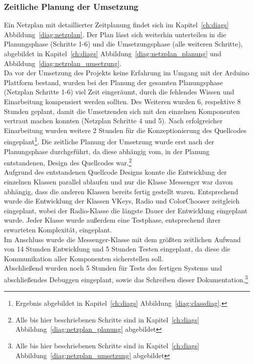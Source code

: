 \documentclass[a4paper, 11pt]{scrartcl}
\begin{document}
\subsubsection{Zeitliche Planung der Umsetzung}
Ein Netzplan mit detaillierter Zeitplanung findet sich im Kapitel~\ref{ch:diags} Abbildung~\ref{diag:netzplan}. Der Plan lässt sich weiterhin unterteilen in die
Planungsphase (Schritte 1-6) und die Umsetzungsphase (alle weiteren Schritte), abgebildet in Kapitel~\ref{ch:diags} Abbildung~\ref{diag:netzplan_planung} 
und Abbildung~\ref{diag:netzplan_umsetzung}.
\\
Da vor der Umsetzung des Projekts keine Erfahrung im Umgang mit der Arduino Plattform bestand, wurden bei der Planung der gesamten Planungsphase (Netzplan Schritte 1-6) 
viel Zeit eingeräumt, durch die fehlendes Wissen und Einarbeitung kompensiert werden sollten. Des Weiteren wurden 6, respektive 8 Stunden geplant, damit die 
Umsetzenden sich mit den einzelnen Komponenten vertraut machen konnten (Netzplan Schritte 4 und 5). Nach erfolgreicher Einarbeitung wurden weitere 2 Stunden
für die Konzeptionierung des Quellcodes eingeplant\footnote{Ergebnis abgebildet in Kapitel~\ref{ch:diags} Abbildung~\ref{diag:classdiag}.}. Die zeitliche 
Planung der Umsetzung wurde erst nach der Planungsphase durchgeführt, da diese abhängig vom, in der Planung entstandenen, Design des Quellcodes war.\footnote{Alle bis hier 
beschriebenen Schritte sind in Kapitel~\ref{ch:diags} Abbildung~\ref{diag:netzplan_planung} abgebildet}
\\
Aufgrund des entstandenen Quellcode Designs konnte die Entwicklung der einzelnen Klassen parallel ablaufen und nur die Klasse \glqq Messenger\grqq{} war davon abhängig,
dass die anderen Klassen bereits fertig gestellt waren. Entsprechend wurde die Entwicklung der Klassen \glqq VKeys\grqq , \glqq Radio\grqq{} und \glqq ColorChooser\grqq{}
zeitgleich eingeplant, wobei der Radio-Klasse die längste Dauer der Entwicklung eingeplant wurde. Jeder Klasse wurde außerdem eine Testphase, entsprechend ihrer erwarteten
Komplexität, eingeplant.
\\
Im Anschluss wurde die Messenger-Klasse mit dem größten zeitlichen Aufwand von 14 Stunden Entwicklung und 5 Stunden Testen eingeplant, da diese die Kommunikation
aller Komponenten sicherstellen soll.
\\
Abschließend wurden noch 5 Stunden für Tests des fertigen Systems und abschließendes Debuggen eingeplant, sowie das Schreiben dieser Dokumentation.\footnote{Alle bis hier 
beschriebenen Schritte sind in Kapitel~\ref{ch:diags} Abbildung~\ref{diag:netzplan_umsetzung} abgebildet}
\end{document}
